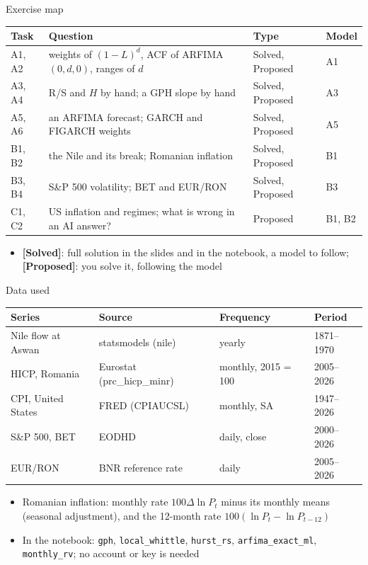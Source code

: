 \begin{frame}{Exercise map}
\itemsize{\small}
\begin{center}
\footnotesize
\begin{tabular}{>{\raggedright\arraybackslash}p{1.1cm}>{\raggedright\arraybackslash}p{7.5cm}>{\raggedright\arraybackslash}p{1.9cm}>{\raggedright\arraybackslash}p{1.4cm}}
\toprule
\textbf{Task} & \textbf{Question} & \textbf{Type} & \textbf{Model} \\
\midrule
A1, A2 & weights of $(1-L)^d$, ACF of ARFIMA$(0,d,0)$, ranges of $d$ & Solved, Proposed & A1 \\
A3, A4 & R/S and $H$ by hand; a GPH slope by hand & Solved, Proposed & A3 \\
A5, A6 & an ARFIMA forecast; GARCH and FIGARCH weights & Solved, Proposed & A5 \\
B1, B2 & the Nile and its break; Romanian inflation & Solved, Proposed & B1 \\
B3, B4 & S\&P 500 volatility; BET and EUR/RON & Solved, Proposed & B3 \\
C1, C2 & US inflation and regimes; what is wrong in an AI answer? & Proposed & B1, B2 \\
\bottomrule
\end{tabular}
\end{center}
\begin{itemize}
    \item \textbf{[Solved]}: full solution in the slides and in the notebook, a model to follow; \textbf{[Proposed]}: you solve it, following the model
\end{itemize}
\end{frame}

\begin{frame}{Data used}
\itemsize{\small}
\begin{center}
\footnotesize
\begin{tabular}{llll}
\toprule
\textbf{Series} & \textbf{Source} & \textbf{Frequency} & \textbf{Period} \\
\midrule
Nile flow at Aswan & statsmodels (nile) & yearly & 1871--1970 \\
HICP, Romania & Eurostat (prc\_hicp\_minr) & monthly, 2015 = 100 & 2005--2026 \\
CPI, United States & FRED (CPIAUCSL) & monthly, SA & 1947--2026 \\
S\&P 500, BET & EODHD & daily, close & 2000--2026 \\
EUR/RON & BNR reference rate & daily & 2005--2026 \\
\bottomrule
\end{tabular}
\end{center}
\begin{itemize}
    \item Romanian inflation: monthly rate $100\Delta\ln P_t$ minus its monthly means (seasonal adjustment), and the 12-month rate $100(\ln P_t - \ln P_{t-12})$
    \item In the notebook: \texttt{gph}, \texttt{local\_whittle}, \texttt{hurst\_rs}, \texttt{arfima\_exact\_ml}, \texttt{monthly\_rv}; no account or key is needed
\end{itemize}
\end{frame}


